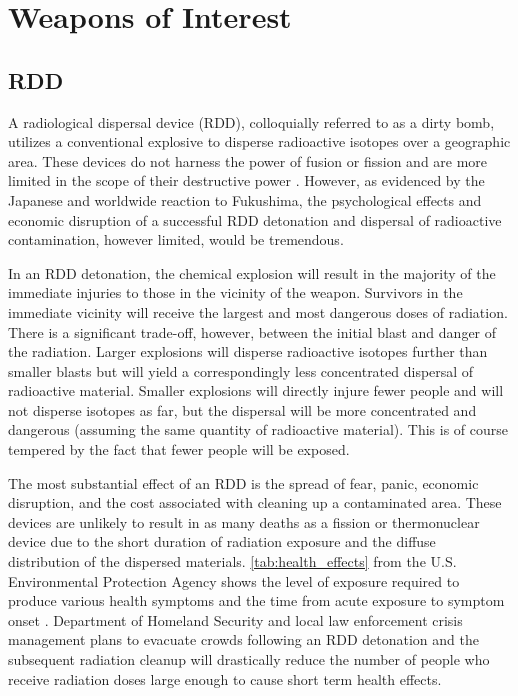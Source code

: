 \documentclass{report}
\begin{document}
\chapter[Appendix D: Weapons of Interest]{Weapons of Interest}  \label{app:weapons}



\section{RDD} \label{sec:RDD}

A radiological dispersal device (RDD), colloquially referred to as a dirty bomb, utilizes a conventional explosive to disperse radioactive isotopes over a geographic area. These devices do not harness the power of fusion or fission and are more limited in the scope of their destructive power \cite{Renewal2011}.  However, as evidenced by the Japanese and worldwide reaction to Fukushima, the psychological effects and economic disruption of a successful RDD detonation and dispersal of radioactive contamination, however limited, would be tremendous.
 
In an RDD detonation, the chemical explosion will result in the majority of the immediate injuries to those in the  vicinity of the weapon. Survivors in the immediate vicinity will receive the largest and most dangerous doses of radiation. There is a significant trade-off, however, between the initial blast and danger of the radiation. Larger explosions will disperse radioactive isotopes  further than smaller blasts but will yield a correspondingly less concentrated dispersal of radioactive material. Smaller explosions will directly injure fewer people and will not disperse isotopes as far,  but the dispersal will be more concentrated and dangerous (assuming the same quantity of radioactive material). This is of course tempered by the fact that fewer people will be exposed.

The most substantial effect of an RDD is the spread of fear, panic, economic disruption, and the cost associated with cleaning up a contaminated area. These devices are unlikely to result in as many deaths as a fission or thermonuclear device due to the short duration of radiation exposure and the diffuse distribution of the dispersed materials. \autoref{tab:health_effects} from the U.S. Environmental Protection Agency shows the level of exposure required to produce various health symptoms and the time from acute exposure to symptom onset \cite{USEPA1999}. Department of Homeland Security  and local law enforcement crisis management plans to evacuate crowds following an RDD detonation and the subsequent radiation cleanup will drastically reduce the number of people who receive radiation doses large enough to cause short term health effects.
\end{document}
